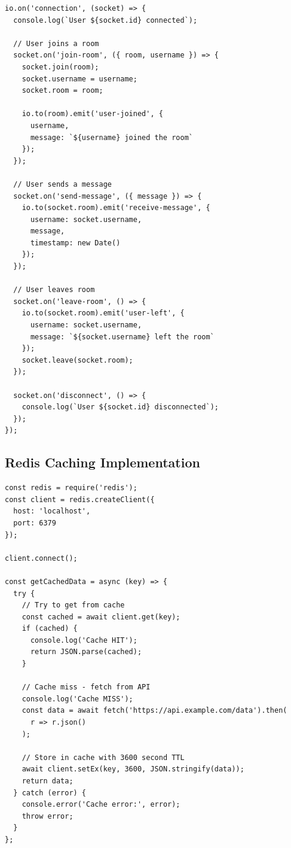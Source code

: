 \begin{lstlisting}[basicstyle=\ttfamily\small, caption=Socket.IO Event Listeners, captionpos=b]
io.on('connection', (socket) => {
  console.log(`User ${socket.id} connected`);
  
  // User joins a room
  socket.on('join-room', ({ room, username }) => {
    socket.join(room);
    socket.username = username;
    socket.room = room;
    
    io.to(room).emit('user-joined', {
      username,
      message: `${username} joined the room`
    });
  });
  
  // User sends a message
  socket.on('send-message', ({ message }) => {
    io.to(socket.room).emit('receive-message', {
      username: socket.username,
      message,
      timestamp: new Date()
    });
  });
  
  // User leaves room
  socket.on('leave-room', () => {
    io.to(socket.room).emit('user-left', {
      username: socket.username,
      message: `${socket.username} left the room`
    });
    socket.leave(socket.room);
  });
  
  socket.on('disconnect', () => {
    console.log(`User ${socket.id} disconnected`);
  });
});
\end{lstlisting}

\subsection{Redis Caching Implementation}

\begin{lstlisting}[basicstyle=\ttfamily\small, caption=Redis Cache with TTL, captionpos=b]
const redis = require('redis');
const client = redis.createClient({
  host: 'localhost',
  port: 6379
});

client.connect();

const getCachedData = async (key) => {
  try {
    // Try to get from cache
    const cached = await client.get(key);
    if (cached) {
      console.log('Cache HIT');
      return JSON.parse(cached);
    }
    
    // Cache miss - fetch from API
    console.log('Cache MISS');
    const data = await fetch('https://api.example.com/data').then(
      r => r.json()
    );
    
    // Store in cache with 3600 second TTL
    await client.setEx(key, 3600, JSON.stringify(data));
    return data;
  } catch (error) {
    console.error('Cache error:', error);
    throw error;
  }
};
\end{lstlisting}

